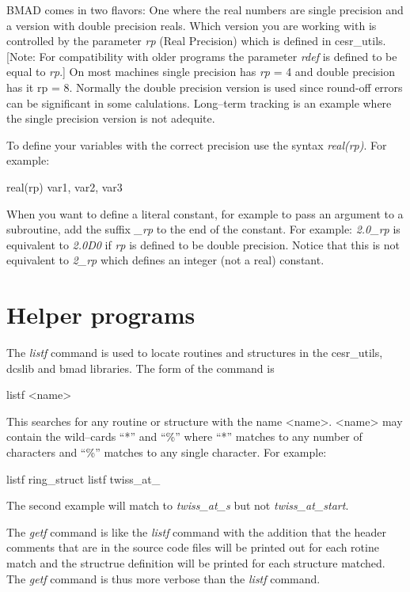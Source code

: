 \documentclass{book}
\begin{document}
BMAD comes in two flavors: One where the real numbers are single
precision and a version with double precision reals. Which version you
are working with is controlled by the parameter {\it rp} (Real Precision)
which is defined in cesr_utils. [Note: For compatibility with older
programs the parameter {\it rdef} is defined to be equal to {\it rp}.]  On most
machines single precision has {\it rp} = 4 and double precision has {it rp} =
8. Normally the double precision version is used since round-off
errors can be significant in some calulations. Long--term tracking is
an example where the single precision version is not adequite. 

To define your variables with the correct precision use the syntax
{\it real(rp)}. For example:
\begin{verbatum}
  real(rp) var1, var2, var3
\end{verbatum}
When you want to define a literal constant, for example to pass an
argument to a subroutine, add the suffix {\it \_rp} to the end of the
constant. For example: {\it 2.0_rp} is equivalent to {\it 2.0D0} if
{\it rp} is defined to be double precision. Notice that this is not
equivalent to {\it 2_rp} which defines an integer (not a real) constant.


\section{Helper programs}

The {\it listf} command is used to locate routines and structures in
the cesr_utils, dcslib and bmad libraries. The form of the command is
\begin{verbatum}
  listf <name>
\end{verbatum}
This searches for any routine or structure with the name
<name>. <name> may contain the wild--cards ``*'' and ``\%'' where
``*'' matches to any number of characters and ``\%'' matches to any
single character. For example:
\begin{verbatum}
  listf ring_struct
  listf twiss_at_%
\end{verbatum}
The second example will match to {\it twiss\_at\_s} but not {\it
twiss\_at\_start}.

The {\it getf} command is like the {\it listf} command with the
addition that the header comments that are in the source code files
will be printed out for each rotine match and the structrue definition
will be printed for each structure matched. The {\it getf} command is
thus more verbose than the {\it listf} command.
\end{document}

